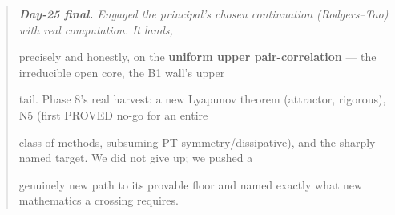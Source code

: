 \documentclass[10pt]{article}
\begin{document}
\begin{quote}\itshape
\textbf{Day-25 final.} Engaged the principal's chosen continuation (Rodgers--Tao) with real computation. It lands,\par
precisely and honestly, on the \textbf{uniform upper pair-correlation} --- the irreducible open core, the B1 wall's upper\par
tail. Phase 8's real harvest: a new Lyapunov theorem (attractor, rigorous), N5 (first PROVED no-go for an entire\par
class of methods, subsuming PT-symmetry/dissipative), and the sharply-named target. We did not give up; we pushed a\par
genuinely new path to its provable floor and named exactly what new mathematics a crossing requires.\par
\end{quote}
\end{document}
